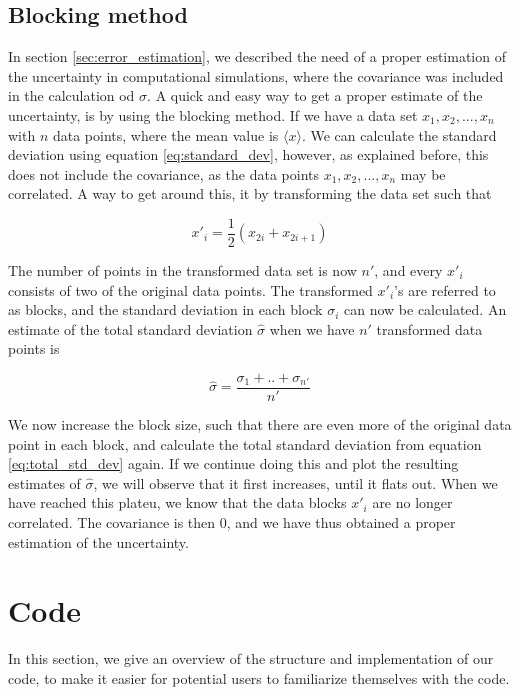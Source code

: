 \documentclass[norsk,a4paper,12pt]{article}
\begin{document}
\subsection{Blocking method} \label{sec:Blocking}
In section \ref{sec:error_estimation}, we described the need of a proper estimation of the uncertainty in computational simulations, where the covariance was included in the calculation od $\sigma$. A quick and easy way to get a proper estimate of the uncertainty, is by using the blocking method. If we have a data set ${x_1, x_2, ..., x_n }$ with $n$ data points, where the mean value is $\langle x \rangle$. We can calculate the standard deviation using equation \ref{eq:standard_dev}, however, as explained before, this does not include the covariance, as the data points ${x_1, x_2, ..., x_n }$  may be correlated.  A way to get around this, it by transforming the data set such that

\begin{equation}
x'_i = \frac{1}{2}(x_{2i} + x_{2i+1})
\end{equation}

The number of points in the transformed data set is now $n'$, and every $x'_i$ consists of two of the original data points. The transformed $x'_i$'s are referred to as blocks, and the standard deviation in each block $\sigma_i$ can now be calculated. An estimate of the total standard deviation $\hat{\sigma}$ when we have $n'$ transformed data points is

\begin{equation}
	\label{eq:total_std_dev}
	\hat{\sigma} = \frac{\sigma_1 + .. + \sigma_{n'}}{n'}
\end{equation} 

We now increase the block size, such that there are even more of the original data point in each block, and calculate the total standard deviation from equation \ref{eq:total_std_dev} again. If we continue doing this and plot the resulting estimates of $\hat{\sigma}$, we will observe that it first increases, until it flats out. When we have reached this plateu, we know that the data blocks $x'_i$ are no longer correlated. The covariance is then 0, and we have thus obtained a proper estimation of the uncertainty. 

\section{Code} \label{sec:Code}
In this section, we give an overview of the structure and implementation of our code, to make it easier for potential users to familiarize themselves with the code. 
\end{document}
